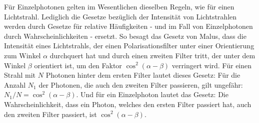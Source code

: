F\"ur Einzelphotonen gelten im Wesentlichen dieselben Regeln, 
wie f\"ur einen Lichtstrahl. Lediglich
die Gesetze bez\"uglich der Intensit\"at von Lichtstrahlen werden durch Gesetze f\"ur relative H\"aufigkeiten
- und im Fall von Einzelphotonen durch Wahrscheinlichkeiten - ersetzt. So besagt das Gesetz
von Malus, 
dass die Intensit\"at eines Lichtstrahls, der einen Polarisationsfilter unter einer Orientierung
zum Winkel $\alpha$ durchquert hat und durch einen zweiten Filter tritt, der unter dem Winkel $\beta$ orientiert
ist, um den Faktor $\cos^2 (\alpha - \beta)$ verringert wird. F\"ur einen Strahl mit $N$ Photonen hinter dem
ersten Filter lautet dieses Gesetz: F\"ur die Anzahl $N_1$ der Photonen, die auch den zweiten Filter passieren, gilt
ungef\"ahr: $N_1/N = \cos^2(\alpha - \beta)$. Und f\"ur ein Einzelphoton lautet das Gesetz: Die Wahrscheinlichkeit,
dass ein Photon, welches den ersten Filter passiert hat, auch den zweiten Filter passiert, ist $\cos^2(\alpha - \beta)$. 

